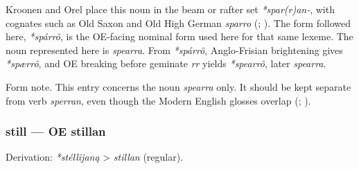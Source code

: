 \documentclass[
  british,
  a4paper,
]{article}
\begin{document}
Kroonen and Orel place this noun in the beam or rafter set
\emph{*spar(r)an-}, with cognates such as Old Saxon and Old High German
\emph{sparro} (;
). The form followed here,
\emph{*spárrô}, is the OE-facing nominal form used here for that same
lexeme. The noun represented here is \emph{spearra}. From
\emph{*spárrô}, Anglo-Frisian brightening gives \emph{*spærrô}, and OE
breaking before geminate \emph{rr} yields \emph{*spearrô}, later
\emph{spearra}.

Form note. This entry concerns the noun \emph{spearra} only. It should
be kept separate from verb \emph{sperran}, even though the Modern
English glosses overlap (;
).

\subsubsection{still --- OE stillan}\label{still-oe-stillan}

Derivation: \emph{*stéllijaną} \textgreater{} \emph{stillan} (regular).

\begingroup
\setlength{\fboxsep}{6pt}
\end{document}
